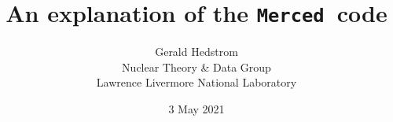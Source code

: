\documentclass[11pt]{report}
\newcommand{\gettransfer}{\texttt{Merced}}
\begin{document}
\title{An explanation of the \gettransfer\ code}
\author{Gerald Hedstrom\\
  Nuclear Theory \& Data Group\\
  Lawrence Livermore National Laboratory}
\date{3 May 2021}
\maketitle

\tableofcontents













\appendix


\end{document}
